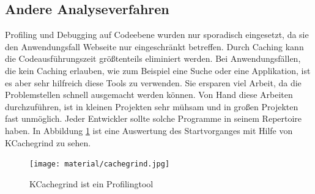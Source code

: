 \subsection{Andere Analyseverfahren}
Profiling und Debugging auf Codeebene wurden nur sporadisch eingesetzt, da sie den Anwendungsfall Webseite nur eingeschränkt betreffen. Durch Caching kann die Codeausführungszeit größtenteils eliminiert werden. Bei Anwendungsfällen, die kein Caching erlauben, wie zum Beispiel eine Suche oder eine Applikation, ist es aber sehr hilfreich diese Tools zu verwenden. Sie ersparen viel Arbeit, da die Problemstellen schnell ausgemacht werden können. Von Hand diese Arbeiten durchzuführen, ist in kleinen Projekten sehr mühsam und in großen Projekten fast unmöglich. Jeder Entwickler sollte solche Programme in seinem Repertoire haben. In Abbildung \ref{fig:cachegrind} ist eine Auswertung des Startvorganges mit Hilfe von KCachegrind zu sehen.
\begin{figure}[!ht]
  \centering
  \texttt{[image: material/cachegrind.jpg]}
  \caption{KCachegrind ist ein Profilingtool}
  \label{fig:cachegrind}
\end{figure}


